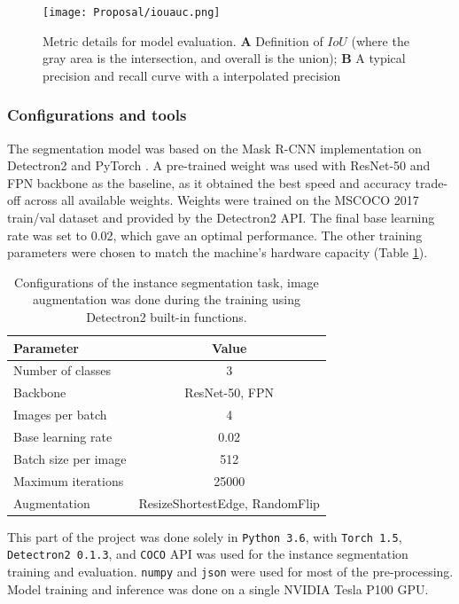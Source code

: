 \documentclass[11pt]{article}
\begin{document}
\begin{figure}[H]
\centering
\texttt{[image: Proposal/iouauc.png]}
\caption{Metric details for model evaluation. \textbf{A} Definition of $IoU$ (where the gray area is the intersection, and overall is the union); \textbf{B} A typical precision and recall curve with a interpolated precision}
\label{fig:iouauc}
\end{figure}


\subsubsection{Configurations and tools}
The segmentation model was based on the Mask R-CNN implementation on Detectron2 \parencite{wu2019detectron2} and PyTorch \parencite{NEURIPS2019_9015}. A pre-trained weight was used with ResNet-50 \parencite{ he2016deep} and FPN \parencite{lin2017feature} backbone as the baseline, as it obtained the best speed and accuracy trade-off across all available weights. Weights were trained on the MSCOCO 2017 train/val dataset and provided by the Detectron2 API. The final base learning rate was set to 0.02, which gave an optimal performance. The other training parameters were chosen to match the machine's hardware capacity (Table \ref{tab:segmethods}).\par

\begin{table}[H]
\centering
\caption{Configurations of the instance segmentation task, image augmentation was done during the training using Detectron2 built-in functions.}
\begin{tabular}{lc}
\hline
Parameter & Value\\
\hline
Number of classes & 3\\
Backbone & ResNet-50, FPN\\ 
Images per batch & 4\\ 
Base learning rate & 0.02\\ 
Batch size per image & 512\\
Maximum iterations & 25000\\ 
Augmentation & ResizeShortestEdge, RandomFlip\\ 
\hline
\end{tabular}
\label{tab:segmethods}
\end{table}

This part of the project was done solely in \texttt{Python 3.6}, with \texttt{Torch 1.5}, \texttt{Detectron2 0.1.3}, and \texttt{COCO} API was used for the instance segmentation training and evaluation. \texttt{numpy} and \texttt{json} were used for most of the pre-processing. Model training and inference was done on a single NVIDIA Tesla P100 GPU.\par
\end{document}
